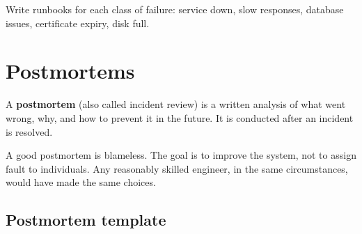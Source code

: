 \begin{codebox}
\begin{Shaded}
\begin{Highlighting}[]


\CommentTok{[}\CommentTok{]}
\end{Highlighting}
\end{Shaded}

\end{codebox}

\noindent{}Write runbooks for each class of failure: service down, slow responses, database issues, certificate expiry, disk full.

\setcounter{section}{9}
\section{Postmortems}\label{37-reliability:3710-postmortems}

A \textbf{postmortem} (also called incident review) is a written analysis of what went wrong, why, and how to prevent it in the future. It is conducted after an incident is resolved.

A good postmortem is blameless. The goal is to improve the system, not to assign fault to individuals. Any reasonably skilled engineer, in the same circumstances, would have made the same choices.

\subsection*{Postmortem template}\label{37-reliability:postmortem-template}

